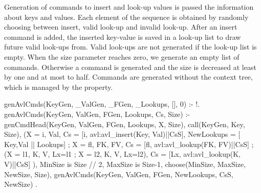 Generation of commands to insert and look-up values is passed the
information about keys and values.
%
Each element of the sequence is obtained by randomly choosing between insert, valid look-up and invalid
look-up.
%
After an insert command is added, the inserted key-value is saved in a
look-up list to draw future valid look-ups from.
%
Valid look-ups are not generated if the look-up list is empty.
%
When the size parameter reaches zero, we generate an empty list of
commands.
%
Otherwise a command is generated and the size is decreased at least by
one and at most to half.
%
Commands are generated without the context tree, which is managed by
the property.
%
\begin{yapcode}
 genAvlCmds(KeyGen, _ValGen, _FGen,
            _Lookups, [], 0) :- !.
 genAvlCmds(KeyGen, ValGen, FGen,
            Lookups, Cs, Size) :-
   genCmdHead(KeyGen, ValGen, FGen,
              Lookups, X, Size),
   call(KeyGen, Key, Size),
   (X = {i, Val},
    Cs = [{i, avl:avl_insert(Key, Val)}||CsS],
    NewLookups = [ {Key,Val} || Lookups]
   ;
    X = {fl, {FK, FV}},
    Cs = [{fl, avl:avl_lookup(FK, FV)}||CsS]
   ;
    (X = {l1, {K, V}}, Lx=l1
    ; X = {l2, {K, V}}, Lx=l2),
    Cs = [{Lx, avl:avl_lookup(K, V)}||CsS]
   ),
   MinSize is Size // 2,
   MaxSize is Size-1,
   choose(MinSize, MaxSize, NewSize, Size),
   genAvlCmds(KeyGen, ValGen, FGen,
              NewLookups, CsS, NewSize)
 .
\end{yapcode}



